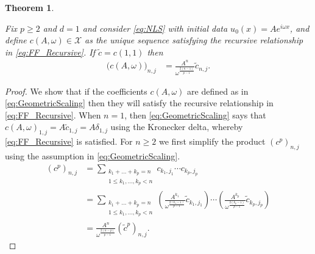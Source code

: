 \documentclass{article}
\newtheorem{theorem}{Theorem}[section]
\newcommand{\cX}{\mathcal{X}}
\begin{document}
\begin{theorem}  \label{prop:Rescaling}

Fix $ p \geq 2$ and $ d =1$ and consider   \eqref{eq:NLS}  	 with initial data $u_0(x) =   A e^{ i \omega  x}$, and 
define $ c(A,\omega) \in \cX$ as the unique sequence  satisfying  the recursive relationship in \eqref{eq:FF_Recursive}. 
If $ \tilde{c} = c(1,1)$ then 
\begin{align} \label{eq:GeometricScaling}
	\big(c(A,\omega)\big)_{n,j} &=  \frac{A^n}{ \omega^{\frac{2(n-1)}{p-1}}  } \tilde{c}_{n,j}  .
\end{align}



\end{theorem}
\begin{proof} 
	We show that if the coefficients $c(A,\omega)$ are defined as in \eqref{eq:GeometricScaling} then they will satisfy the recursive relationship in \eqref{eq:FF_Recursive}. 
When $n=1$, then  \eqref{eq:GeometricScaling}  says that $ c(A,\omega)_{1,j} = A \tilde{c}_{1,j} = A \delta_{1,j}$ using the Kronecker delta,  whereby  \eqref{eq:FF_Recursive} is satisfied. 
For $n \geq 2 $ we first simplify the product $ (c^p)_{n,j}$ using the assumption in \eqref{eq:GeometricScaling}. 
	\begin{align}
		(c^p)_{n,j}
		&= 
		\sum_{\substack{k_1 + \dots + k_p = n \\ 1 \leq k_1, \dots , k_p < n } }
		c_{k_1,j_1} 
		\cdots   
		c_{k_p,j_p}  \nonumber
		\\ 
		 &= 
		\sum_{\substack{k_1 + \dots + k_p = n \\ 1 \leq k_1, \dots , k_p < n } }
		\left(
		\frac{A^{k_1}}{ \omega^{\frac{2({k_1}-1)}{p-1}}  } \tilde{c}_{k_1,j_1} 
		\right)
		\cdots   
		\left(	 	 \frac{A^{k_p}}{ \omega^{\frac{2({k_p}-1)}{p-1}}  } \tilde{c}_{k_p,j_p} 
		\right)  
		\nonumber  \\ 
		&=  \frac{A^{n}}{ \omega^{\frac{2(n-p)}{p-1}}  } (\tilde{c}^p)_{n,j} . \label{eq:SimplifiedRescalingProduct}
	\end{align}
	

\end{proof}
\end{document}
